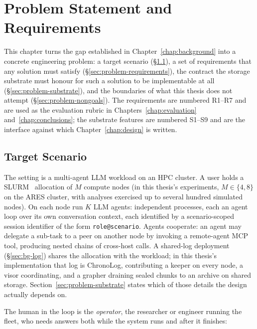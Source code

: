 \chapter{Problem Statement and Requirements}
\label{chap:problem}

This chapter turns the gap established in Chapter~\ref{chap:background}
into a concrete engineering problem: a target scenario
(\S\ref{sec:problem-scenario}), a set of requirements that any solution
must satisfy (\S\ref{sec:problem-requirements}), the contract the storage
substrate must honour for such a solution to be implementable at all
(\S\ref{sec:problem-substrate}), and the boundaries of what this thesis
does not attempt (\S\ref{sec:problem-nongoals}). The
requirements are numbered R1--R7 and are used as the evaluation rubric in
Chapters~\ref{chap:evaluation} and~\ref{chap:conclusions}; the substrate
features are numbered S1--S9 and are the interface against which
Chapter~\ref{chap:design} is written.

\section{Target Scenario}
\label{sec:problem-scenario}

The setting is a multi-agent LLM workload on an HPC cluster. A user holds
a SLURM~\cite{yoo2003slurm} allocation of $M$ compute nodes (in this thesis's experiments,
$M \in \{4, 8\}$ on the ARES cluster, with analyses exercised up to
several hundred simulated nodes). On each node run $K$ LLM agents:
independent processes, each an agent loop over its own conversation
context, each identified by a scenario-scoped session identifier of the
form \texttt{role@scenario}. Agents cooperate: an agent may delegate a
sub-task to a peer on another node by invoking a remote-agent
MCP~\cite{anthropic2024mcp} tool,
producing nested chains of cross-host calls. A shared-log deployment
(\S\ref{sec:bg-log}) shares the allocation with the workload; in this
thesis's implementation that log is ChronoLog, contributing a keeper on
every node, a visor coordinating, and a grapher draining sealed chunks to
an archive on shared storage. Section~\ref{sec:problem-substrate} states
which of those details the design actually depends on.

The human in the loop is the \emph{operator}, the researcher or
engineer running the fleet, who needs answers both while the system runs
and after it finishes:

